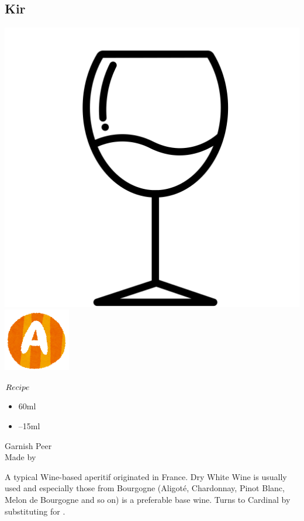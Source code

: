 \subsection{Kir}
\vspace{-7.6mm}
\hspace{18mm}
\includegraphics[scale=.03]{cocktail_glass_sour.png}
\includegraphics[scale=.12]{capital_a.png}
\vspace{2.5mm}
\begin{itembox}[l]{\boldmath $Recipe$}
\begin{itemize}
\setlength{\parskip}{0cm}
\setlength{\itemsep}{0cm}
\item \ww 60ml
\item {}--15ml
\end{itemize}
\vspace{-4mm}
Garnish \lemon Peer\\
Made by \build
\end{itembox}
A typical Wine-based aperitif originated in France.
Dry White Wine is usually used and especially those from Bourgogne (Aligot\'{e}, Chardonnay, Pinot Blanc, Melon de Bourgogne and so on) is a preferable base wine.
Turns to Cardinal by substituting \rw for \ww
\hspace{-1mm}.
